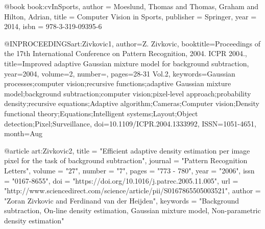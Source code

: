 @book{ book:cvInSports,
	author = {Moeslund, Thomas and Thomas, Graham and Hilton, Adrian},
	title = {Computer Vision in Sports},
	publisher = {Springer},
	year = {2014},
	isbn = {978-3-319-09395-6}
}

@INPROCEEDINGS{art:Zivkovic1,
    author={Z. Zivkovic},
    booktitle={Proceedings of the 17th International Conference on Pattern Recognition, 2004. ICPR 2004.},
    title={Improved adaptive Gaussian mixture model for background subtraction},
    year={2004},
    volume={2},
    number={},
    pages={28-31 Vol.2},
    keywords={Gaussian processes;computer vision;recursive functions;adaptive Gaussian mixture model;background subtraction;computer vision;pixel-level approach;probability density;recursive equations;Adaptive algorithm;Cameras;Computer vision;Density functional theory;Equations;Intelligent systems;Layout;Object detection;Pixel;Surveillance},
    doi={10.1109/ICPR.2004.1333992},
    ISSN={1051-4651},
    month={Aug}
}

@article{ art:Zivkovic2,
    title = "Efficient adaptive density estimation per image pixel for the task of background subtraction",
    journal = "Pattern Recognition Letters",
    volume = "27",
    number = "7",
    pages = "773 - 780",
    year = "2006",
    issn = "0167-8655",
    doi = "https://doi.org/10.1016/j.patrec.2005.11.005",
    url = "http://www.sciencedirect.com/science/article/pii/S0167865505003521",
    author = "Zoran Zivkovic and Ferdinand van der Heijden",
    keywords = "Background subtraction, On-line density estimation, Gaussian mixture model, Non-parametric density estimation"
}

